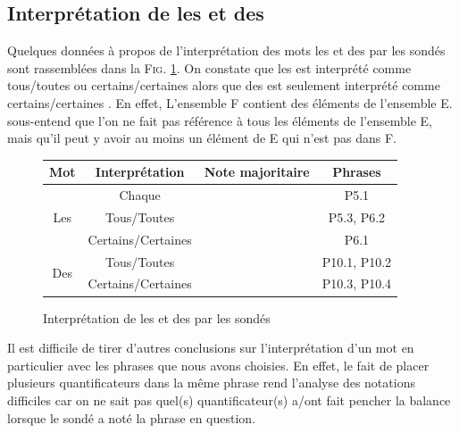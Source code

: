 \documentclass[11pt,letterpaper]{article}
\begin{document}
\newpage

\subsection{Interprétation de \og les \fg{} et \og des \fg{}}

Quelques données à propos de l'interprétation des mots \og les \fg{} et \og des \fg{} par les sondés sont rassemblées dans la \textsc{Fig. }\ref{fig:conclusion}. On constate que \og les \fg{} est interprété comme \og tous/toutes \fg{} ou \og certains/certaines \fg{} alors que \og des \fg{} est seulement interprété comme \og certains/certaines \fg{}. En effet, \og L'ensemble F contient des éléments de l'ensemble E.\fg{} sous-entend que l'on ne fait pas référence à tous les éléments de l'ensemble E, mais qu'il peut y avoir au moins un élément de E qui n'est pas dans F.

\vspace{7px}

\begin{figure}[htbp]
\begin{center}
\begin{tabular}{|c|c|c|c|}
    \hline
      \textbf{Mot} & \textbf{Interprétation} & \textbf{Note majoritaire} & \textbf{Phrases}\\
      \hline
      \multirow{3}{*}{Les} & Chaque & \cellcolor{blue} & P5.1\\\cline{2-4}
      & Tous/Toutes & \cellcolor{green} & P5.3, P6.2\\\cline{2-4}
      & Certains/Certaines & \cellcolor{green} & P6.1\\
      \hline
      \multirow{2}{*}{Des} & Tous/Toutes & \cellcolor{red} & P10.1, P10.2\\\cline{2-4}
      & Certains/Certaines & \cellcolor{green} & P10.3, P10.4\\
      \hline
    \end{tabular}
\caption{Interprétation de \og les \fg{} et \og des \fg{} par les sondés}
\label{fig:conclusion}
\end{center}
\end{figure}

Il est difficile de tirer d'autres conclusions sur l'interprétation d'un mot en particulier avec les phrases que nous avons choisies. En effet, le fait de placer plusieurs quantificateurs dans la même phrase rend l'analyse des notations difficiles car on ne sait pas quel(s) quantificateur(s) a/ont fait pencher la balance lorsque le sondé a noté la phrase en question.
\end{document}
